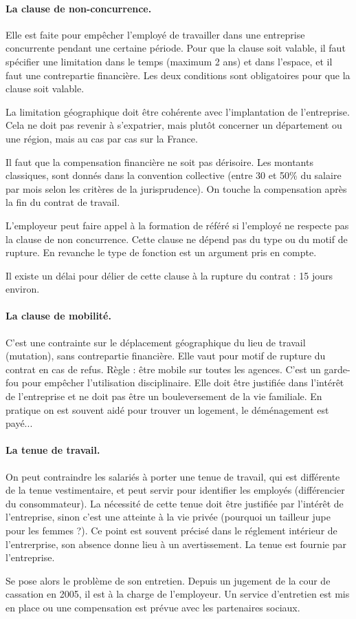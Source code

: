 	\paragraph{La clause de non-concurrence.}
	Elle est faite pour empêcher l’employé de travailler dans une entreprise concurrente pendant une certaine période.
	Pour que la clause soit valable, il faut spécifier une limitation dans le temps (maximum 2 ans) et dans l’espace, et il faut une contrepartie financière.
	Les deux conditions sont obligatoires pour que la clause soit valable.
	
	La limitation géographique doit être cohérente avec l'implantation de l'entreprise.
	Cela ne doit pas revenir à s'expatrier, mais plutôt concerner un département ou une région, mais au cas par cas sur la France.
	
	Il faut que la compensation financière ne soit pas dérisoire.
	Les montants classiques, sont donnés dans la convention collective (entre 30 et 50\% du salaire par mois selon les critères de la jurisprudence).
	On touche la compensation après la fin du contrat de travail.
	
	L’employeur peut faire appel à la formation de référé si l’employé ne respecte pas la clause de non concurrence.
	Cette clause ne dépend pas du type ou du motif de rupture.
	En revanche le type de fonction est un argument pris en compte.
	
	Il existe un délai pour délier de cette clause à la rupture du contrat : 15 jours environ.
	
	\paragraph{La clause de mobilité.}
	C'est une contrainte sur le déplacement géographique du lieu de travail (mutation), sans contrepartie financière.
	Elle vaut pour motif de rupture du contrat en cas de refus.
	Règle : être mobile sur toutes les agences.
	C'est un garde-fou pour empêcher l'utilisation disciplinaire.
	Elle doit être justifiée dans l'intérêt de l'entreprise et ne doit pas être un bouleversement de la vie familiale.
	En pratique on est souvent aidé pour trouver un logement, le déménagement est payé...
	
	\paragraph{La tenue de travail.}
	On peut contraindre les salariés à porter une tenue de travail, qui est différente de la tenue vestimentaire, et peut servir pour identifier les employés (différencier du consommateur).
	La nécessité de cette tenue doit être justifiée par l'intérêt de l'entreprise, sinon c'est une atteinte à la vie privée (pourquoi un tailleur jupe pour les femmes ?).
	Ce point est souvent précisé dans le réglement intérieur de l'entrerprise, son absence donne lieu à un avertissement.
	La tenue est fournie par l'entreprise.
	
	Se pose alors le problème de son entretien.
	Depuis un jugement de la cour de cassation en 2005, il est à la charge de l'employeur.
	Un service d'entretien est mis en place ou une compensation est prévue avec les partenaires sociaux.